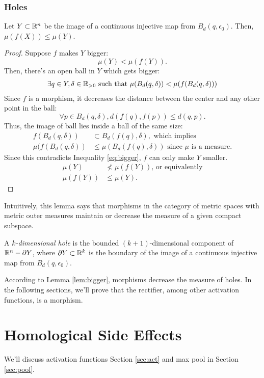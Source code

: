 \subsubsection{Holes}
\begin{lemma}\label{lem:bigger}
Let $Y\subset \mathbb{R}^n$ be the image of a continuous injective map from $B_d(q,\epsilon_0)$. Then, $\mu(f(X))\le \mu(Y)$.
\end{lemma}
\begin{proof}
Suppose $f$ makes $Y$ bigger:
$$\mu(Y)<\mu(f(Y)).$$
Then, there's an open ball in $Y$ which gets bigger:
\begin{align}\label{eq:bigger}
    \exists q\in Y, \delta\in \mathbb{R}_{>0} \text{ such that } \mu(B_d(q,\delta))< \mu(f(B_d(q,\delta)))
\end{align}
Since $f$ is a morphism, it decreases the distance between the center and any other point in the ball:
$$\forall p\in B_d(q,\delta),  d(f(q), f(p))\le d(q,p).$$
Thus, the image of ball lies inside a ball of the same size:
\begin{align*}
    f(B_d(q,\delta)) &\subset B_d(f(q), \delta), \text{ which implies }\\
    \mu(f(B_d(q,\delta)) &\le \mu(B_d(f(q), \delta)) \text{ since $\mu$ is a measure.}
\end{align*}
Since this contradicts Inequality \ref{eq:bigger}, $f$ can only make $Y$ smaller.
\begin{align*}
    \mu(Y) &\nless \mu(f(Y)) \text{, or equivalently} \\
    \mu(f(Y)) &\le \mu(Y).
\end{align*}
\end{proof}
Intuitively, this lemma says that morphisms in the category of metric spaces with metric outer measures maintain or decrease the measure of a given compact subspace.

\begin{definition}
A \emph{$k$-dimensional hole} is the bounded $(k+1)$-dimensional component of $\mathbb{R}^n-\partial Y$, where $\partial Y\subset \mathbb{R}^{k}$ is the boundary of the image of a continuous injective map from $ B_d(q,\epsilon_0)$.
\end{definition}

According to Lemma \ref{lem:bigger}, morphisms decrease the measure of holes.
In the following sections, we'll prove that the rectifier, among other activation functions, is a morphism.

\section{Homological Side Effects}\label{sec:holes}
We'll discuss activation functions Section \ref{sec:act} and max pool in Section \ref{sec:pool}.

